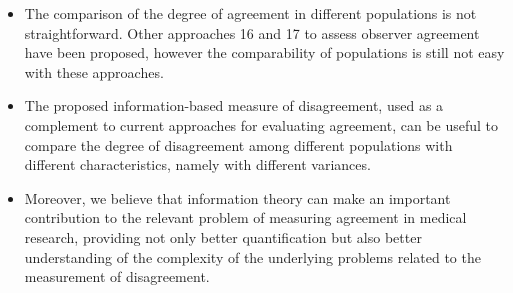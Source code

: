 \documentclass[Chap3bmain.tex]{subfiles}
\begin{document}
\begin{itemize}
\item The comparison of the degree of agreement in different populations is not straightforward. Other approaches 16 and 17 to assess observer agreement have been proposed, however the comparability of populations is still not easy with these approaches.

\item The proposed information-based measure of disagreement, used as a complement to current approaches for evaluating agreement, can be useful to compare the degree of disagreement among different populations with different characteristics, namely with different variances.

\item Moreover, we believe that information theory can make an important contribution to the relevant problem of measuring agreement in medical research, providing not only better quantification but also better understanding of the complexity of the underlying problems related to the measurement of disagreement.
\end{itemize}
\end{document}
